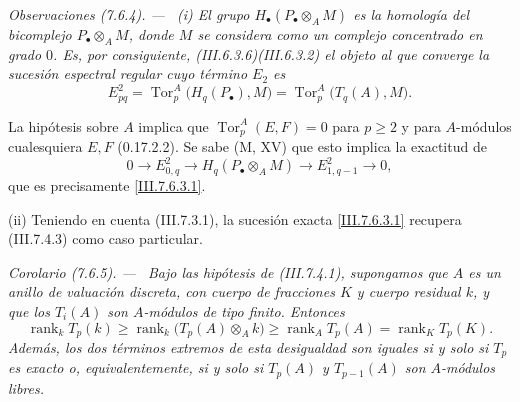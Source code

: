 \documentclass[10pt,oneside]{book}
\newcommand{\Tor}{\operatorname{Tor}}
\newcommand{\sref}[2][]{\textup{(#2)}}
\newcommand{\oldpage}[2][]{\setcounter{footnote}{0}\marginpar{\scriptsize\textbf{#1}~|~#2}\ignorespaces}
\newenvironment{corollary}[1][]{\par\medskip\noindent\itshape Corolario (#1). ---\ }{\par}
\newenvironment{remarks}[1][]{\par\medskip\noindent\itshape Observaciones (#1). ---\ }{\par}
\begin{document}
\begin{remarks}[7.6.4]
\label{III.7.6.4}
\textnormal{(i)}
El grupo $H_\bullet(P_\bullet\otimes_A M)$ es la homología del
bicomplejo $P_\bullet\otimes_A M$, donde $M$ se considera como un
complejo concentrado en grado $0$. Es, por consiguiente,
\sref{III.6.3.6}\sref{III.6.3.2} el objeto al que converge la sucesión
espectral regular cuyo término $E_2$ es
\[
  E^2_{pq}
  =
  \Tor_p^A\bigl(H_q(P_\bullet),M\bigr)
  =
  \Tor_p^A\bigl(T_q(A),M\bigr).
\]

\oldpage[III]{194}
La hipótesis sobre $A$ implica que $\Tor_p^A(E,F)=0$ para $p\geq 2$
y para $A$-módulos cualesquiera $E,F$ \sref[0]{0.17.2.2}. Se sabe
(M, XV) que esto implica la exactitud de
\[
  0\longrightarrow E^2_{0,q}
  \longrightarrow H_q(P_\bullet\otimes_A M)
  \longrightarrow E^2_{1,q-1}
  \longrightarrow 0,
\]
que es precisamente \eqref{III.7.6.3.1}.

\medskip
\textnormal{(ii)}
Teniendo en cuenta \sref{III.7.3.1}, la sucesión exacta
\eqref{III.7.6.3.1} recupera \sref{III.7.4.3} como caso particular.
\end{remarks}

\begin{corollary}[7.6.5]
\label{III.7.6.5}
Bajo las hipótesis de \sref{III.7.4.1}, supongamos que $A$ es un
anillo de valuación discreta, con cuerpo de fracciones $K$ y cuerpo
residual $k$, y que los $T_i(A)$ son $A$-módulos de tipo finito.
Entonces
\[
  \operatorname{rank}_k T_p(k)
  \geq
  \operatorname{rank}_k\bigl(T_p(A)\otimes_A k\bigr)
  \geq
  \operatorname{rank}_A T_p(A)
  =
  \operatorname{rank}_K T_p(K).
  \tag{7.6.5.1}\label{III.7.6.5.1}
\]
Además, los dos términos extremos de esta desigualdad son iguales si
y solo si $T_p$ es exacto o, equivalentemente, si y solo si $T_p(A)$
y $T_{p-1}(A)$ son $A$-módulos libres.
\end{corollary}
\end{document}
